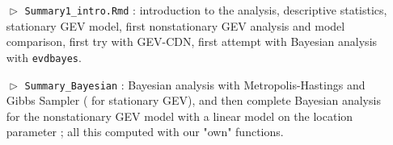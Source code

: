 \begin{itemize}
\begin{itemize}
	\item[$\vartriangleright$] \texttt{Summary1\_intro.Rmd} : introduction to the analysis, descriptive statistics, stationary GEV model, first nonstationary GEV analysis and model comparison, first try with GEV-CDN, first attempt with Bayesian analysis with \texttt{evdbayes}.
		\item[$\vartriangleright$] \texttt{Summary\_Bayesian} : Bayesian analysis with Metropolis-Hastings and Gibbs Sampler ( for stationary GEV), and then complete Bayesian analysis for the nonstationary GEV model with a linear model on the location parameter ; all this computed with our "own" functions. 
\end{itemize}

\end{itemize}

